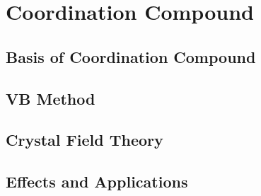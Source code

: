 \section{Coordination Compound}
\subsection{Basis of Coordination Compound}
\subsection{VB Method}
\subsection{Crystal Field Theory}
\subsection{Effects and Applications}

\newpage
